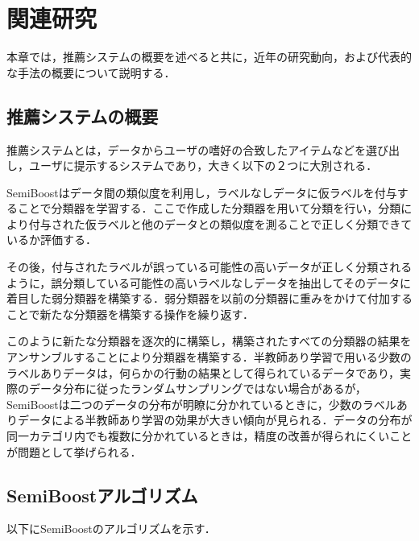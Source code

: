 \chapter{関連研究}

本章では，推薦システムの概要を述べると共に，近年の研究動向，および代表的な手法の概要について説明する．

\section{推薦システムの概要}
\label{sec:Rec_intro}

推薦システムとは，データからユーザの嗜好の合致したアイテムなどを選び出し，ユーザに提示するシステムであり，大きく以下の２つに大別される．




\newpage
SemiBoostはデータ間の類似度を利用し，ラベルなしデータに仮ラベルを付与することで分類器を学習する．ここで作成した分類器を用いて分類を行い，分類により付与された仮ラベルと他のデータとの類似度を測ることで正しく分類できているか評価する．\par
その後，付与されたラベルが誤っている可能性の高いデータが正しく分類されるように，誤分類している可能性の高いラベルなしデータを抽出してそのデータに着目した弱分類器を構築する．弱分類器を以前の分類器に重みをかけて付加することで新たな分類器を構築する操作を繰り返す．\par

このように新たな分類器を逐次的に構築し，構築されたすべての分類器の結果をアンサンブルすることにより分類器を構築する．半教師あり学習で用いる少数のラベルありデータは，何らかの行動の結果として得られているデータであり，実際のデータ分布に従ったランダムサンプリングではない場合があるが，SemiBoostは二つのデータの分布が明瞭に分かれているときに，少数のラベルありデータによる半教師あり学習の効果が大きい傾向が見られる．データの分布が同一カテゴリ内でも複数に分かれているときは，精度の改善が得られにくいことが問題として挙げられる．
\section{SemiBoostアルゴリズム}
\label{sec:SemiBoost}
以下にSemiBoostのアルゴリズムを示す．


